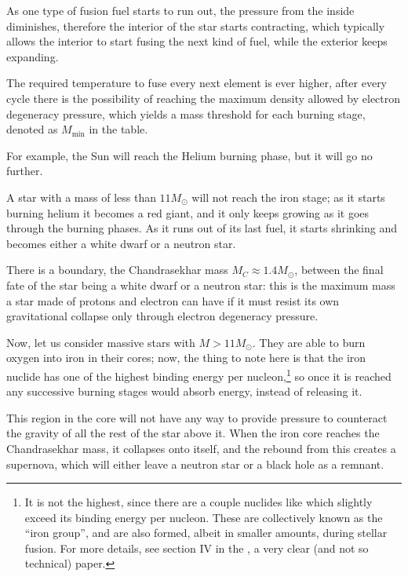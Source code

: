 \documentclass[main.tex]{subfiles}
\begin{document}
As one type of fusion fuel starts to run out, the pressure from the inside diminishes, therefore the interior of the star starts contracting, which typically allows the interior to start fusing the next kind of fuel, while the exterior keeps expanding. 

The required temperature to fuse every next element is ever higher, after every cycle there is the possibility of reaching the maximum density allowed by electron degeneracy pressure, which yields a mass threshold for each burning stage, denoted as \(M _{\text{min}}\) in the table.

For example, the Sun will reach the Helium burning phase, but it will go no further.

A star with a mass of less than \(11 M_{\odot}\) will not reach the iron stage; as it starts burning helium it becomes a red giant, and it only keeps growing as it goes through the burning phases. As it runs out of its last fuel, it starts shrinking and becomes either a white dwarf or a neutron star.

There is a boundary, the Chandrasekhar mass \(M_C \approx \num{1.4} M_{\odot}\), between the final fate of the star being a white dwarf or a neutron star: this is the maximum mass a star made of protons and electron can have if it must resist its own gravitational collapse only through electron degeneracy pressure. 

Now, let us consider massive stars with \(M > 11M _{\odot}\). They are able to burn oxygen into iron in their cores; now, the thing to note here is that the iron nuclide  has one of the highest binding energy per nucleon,\footnote{It is not the highest, since there are a couple nuclides like  which slightly exceed its binding energy per nucleon. These are collectively known as the ``iron group'', and are also formed, albeit in smaller amounts, during stellar fusion. For more details, see section IV in the \textcite[]{fewellAtomicNuclideHighest1995}, a very clear (and not so technical) paper.} so once it is reached any successive burning stages would absorb energy, instead of releasing it.

This region in the core will not have any way to provide pressure to counteract the gravity of all the rest of the star above it. 
When the iron core reaches the Chandrasekhar mass, it collapses onto itself, and the rebound from this creates a supernova, which will either leave a neutron star or a black hole as a remnant.
\end{document}
